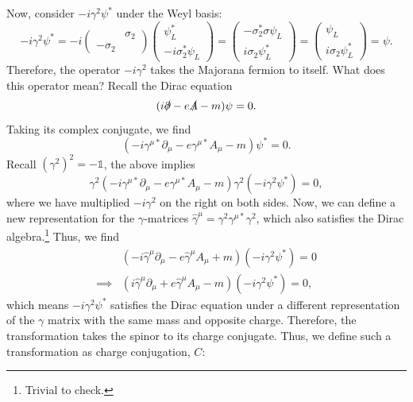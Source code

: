 \documentclass[11pt]{article}
\theoremstyle{definition}
\begin{document}
Now, consider $-i\gamma^2\psi^*$ under the Weyl basis:
\begin{equation}
    -i\gamma^2\psi^* = -i
    \begin{pmatrix}
        & \sigma_2\\
        -\sigma_2
    \end{pmatrix}
    \begin{pmatrix}
        \psi_L^* \\ -i\sigma_2^*\psi_L
    \end{pmatrix}
    = \begin{pmatrix}
        -\sigma_2^*\sigma\psi_L \\ i\sigma_2\psi_L^*
    \end{pmatrix}
    = \begin{pmatrix}
        \psi_L \\ i\sigma_2\psi_L^*
    \end{pmatrix} = \psi.
    \label{Eq. majo C}
\end{equation}
Therefore, the operator $-i\gamma^2$ takes the Majorana fermion to itself. What does this operator mean? Recall the Dirac equation
\begin{equation}
    (i\slashed{\partial} - e\slashed{A} -m ) \psi = 0.
\end{equation}
Taking its complex conjugate, we find
\begin{equation}
    (-i\gamma^{\mu*}\partial_\mu - e\gamma^{\mu*}A_\mu -m)\psi^* = 0.
\end{equation}
Recall $(\gamma^2)^2 = -  \mathds{1}$, the above implies
\begin{equation}
    \gamma^2(-i\gamma^{\mu*}\partial_\mu - e\gamma^{\mu*}A_\mu -m)\gamma^2(-i\gamma^2\psi^*) = 0,
\end{equation}
where we have multiplied $-i\gamma^2$ on the right on both sides. Now, we can define a new representation for the $\gamma$-matrices $\hat{\gamma}^\mu = \gamma^2\gamma^{\mu*}\gamma^2$, which also satisfies the Dirac algebra.\footnote{Trivial to check.} Thus, we find
\begin{equation}
\begin{aligned}
        &(-i\hat{\gamma}^{\mu}\partial_\mu - e\hat{\gamma}^{\mu}A_\mu + m)(-i\gamma^2\psi^*) = 0 \\
        \implies&(i\hat{\gamma}^{\mu}\partial_\mu + e\hat{\gamma}^{\mu}A_\mu - m)(-i\gamma^2\psi^*) = 0,
\end{aligned}
\end{equation}
which means $-i\gamma^2\psi^*$ satisfies the Dirac equation under a different representation of the $\gamma$ matrix with the same mass and opposite charge. Therefore, the transformation takes the spinor to its charge conjugate. Thus, we define such a transformation as charge conjugation, $C$:
\end{document}
